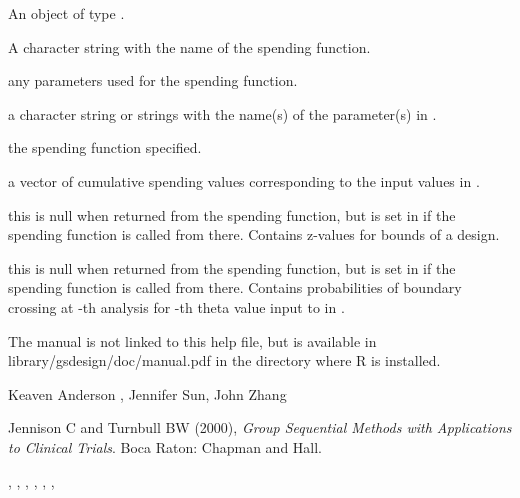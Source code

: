 \begin{Value}
An object of type .
\begin{ldescription}
\item[\code{name}] A character string with the name of the spending function.
\item[\code{param}] any parameters used for the spending function.
\item[\code{parname}] a character string or strings with the name(s) of the parameter(s) in .
\item[\code{sf}] the spending function specified.
\item[\code{spend}] a vector of cumulative spending values corresponding to the input values in .
\item[\code{bound}] this is null when returned from the spending function, 
but is set in  if the spending function is called from there. 
Contains z-values for bounds of a design.
\item[\code{prob}] this is null when returned from the spending function, 
but is set in  if the spending function is called from there. 
Contains probabilities of boundary crossing at -th analysis for -th theta value 
input to  in .
\end{ldescription}
\end{Value}
\begin{Note}\relax
The manual is not linked to this help file, but is available in library/gsdesign/doc/manual.pdf
in the directory where R is installed.
\end{Note}
\begin{Author}\relax
Keaven Anderson , Jennifer Sun, John Zhang
\end{Author}
\begin{References}\relax
Jennison C and Turnbull BW (2000), \emph{Group Sequential Methods with Applications to Clinical Trials}.
Boca Raton: Chapman and Hall.
\end{References}
\begin{SeeAlso}\relax
{}, , , 
, , , 
\end{SeeAlso}
